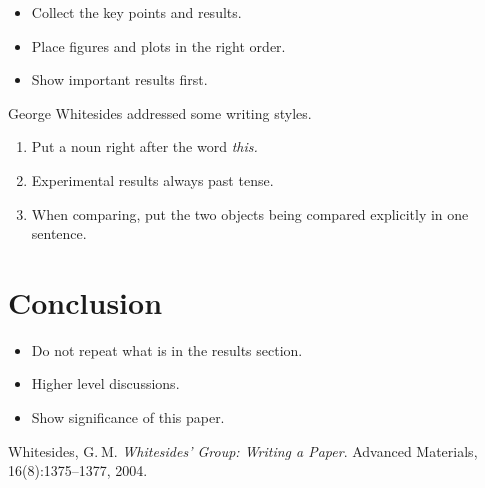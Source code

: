 \documentclass[%
 reprint,
 amsmath,amssymb,
 aps,
]{revtex4-1}
\begin{document}
\begin{itemize}
\item Collect the key points and results.
\item Place figures and plots in the right order.
\item Show important results first.
\end{itemize}


George Whitesides addressed some writing styles.\cite{Whitesides2004}

\begin{enumerate}
    \item Put a noun right after the word \em{this}.
    \item Experimental results always past tense.
    \item When comparing, put the two objects being compared explicitly in one sentence. 
\end{enumerate}



\section{\label{conclusion}Conclusion}

\begin{itemize}
    \item Do not repeat what is in the results section.
    \item Higher level discussions.
    \item Show significance of this paper.
\end{itemize}



\medskip
 
\begin{thebibliography}{9}
Whitesides, G. M.
\textit{Whitesides' Group: Writing a Paper}. 
Advanced Materials, 16(8):1375--1377, 2004.
\end{thebibliography}
\end{document}

